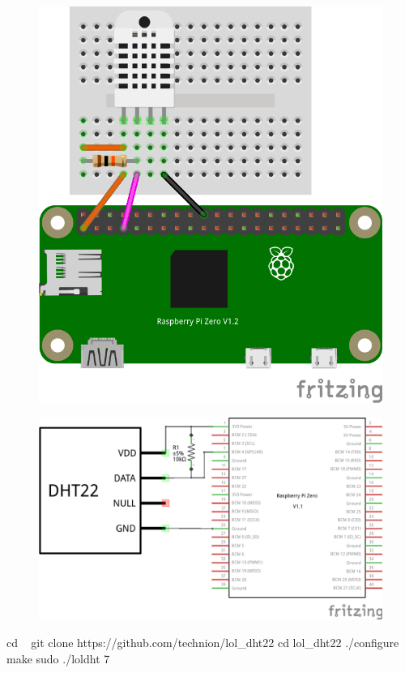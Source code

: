 

\begin{figure}[ht]
  \centering
  \includegraphics[scale=1.0, angle=-90]{images/DHT22_Steckplatine.png}	
  \label{DHT22_Steckplatine}
\end{figure}


\begin{figure}[ht]
	\centering
	\includegraphics[scale=0.25]{images/DHT22_Schaltplan.png}	
	\label{DHT22_Steckplatine}
\end{figure}



\begin{console}
cd ~
git clone https://github.com/technion/lol_dht22
cd lol_dht22
./configure
make
sudo ./loldht 7
\end{console}